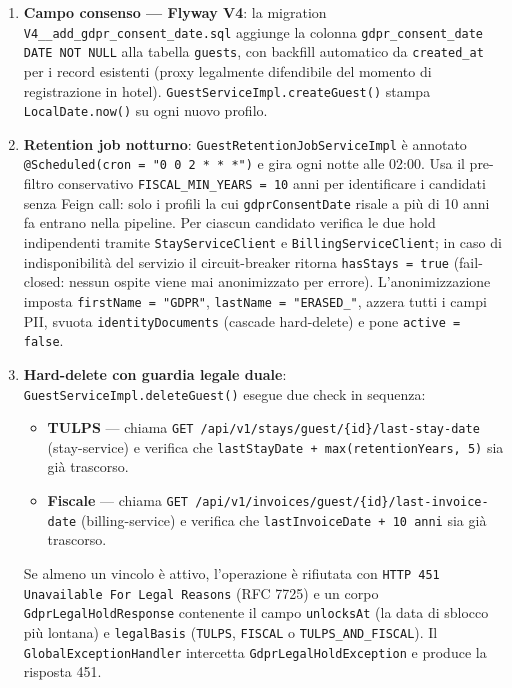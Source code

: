 ﻿\documentclass[a4paper,12pt]{report}
\begin{document}
\begin{enumerate}
  \item \textbf{Campo consenso --- Flyway V4}: la migration
        \texttt{V4\_\_add\_gdpr\_consent\_date.sql} aggiunge la colonna
        \texttt{gdpr\_consent\_date DATE NOT NULL} alla tabella \texttt{guests},
        con backfill automatico da \texttt{created\_at} per i record esistenti
        (proxy legalmente difendibile del momento di registrazione in hotel).
        \texttt{GuestServiceImpl.createGuest()} stampa \texttt{LocalDate.now()}
        su ogni nuovo profilo.

  \item \textbf{Retention job notturno}:
        \texttt{GuestRetentionJobServiceImpl} è annotato
        \texttt{@Scheduled(cron = "0 0 2 * * *")} e gira ogni notte alle 02:00.
        Usa il pre-filtro conservativo \texttt{FISCAL\_MIN\_YEARS = 10} anni
        per identificare i candidati senza Feign call: solo i profili la cui
        \texttt{gdprConsentDate} risale a più di 10 anni fa entrano nella
        pipeline. Per ciascun candidato verifica le due hold indipendenti tramite
        \texttt{StayServiceClient} e \texttt{BillingServiceClient}; in caso di
        indisponibilità del servizio il circuit-breaker ritorna
        \texttt{hasStays = true} (fail-closed: nessun ospite viene mai
        anonimizzato per errore). L'anonimizzazione imposta
        \texttt{firstName = "GDPR"}, \texttt{lastName = "ERASED\_<id-prefix>"},
        azzera tutti i campi PII, svuota \texttt{identityDocuments}
        (cascade hard-delete) e pone \texttt{active = false}.

  \item \textbf{Hard-delete con guardia legale duale}:
        \texttt{GuestServiceImpl.deleteGuest()} esegue due check in sequenza:
        \begin{itemize}
          \item \textbf{TULPS} --- chiama \texttt{GET /api/v1/stays/guest/\{id\}/last-stay-date}
                (stay-service) e verifica che \texttt{lastStayDate + max(retentionYears, 5)} sia
                già trascorso.
          \item \textbf{Fiscale} --- chiama \texttt{GET /api/v1/invoices/guest/\{id\}/last-invoice-date}
                (billing-service) e verifica che \texttt{lastInvoiceDate + 10 anni} sia
                già trascorso.
        \end{itemize}
        Se almeno un vincolo è attivo, l'operazione è rifiutata con
        \texttt{HTTP 451 Unavailable For Legal Reasons} (RFC 7725) e un corpo
        \texttt{GdprLegalHoldResponse} contenente il campo \texttt{unlocksAt}
        (la data di sblocco più lontana) e \texttt{legalBasis}
        (\texttt{TULPS}, \texttt{FISCAL} o \texttt{TULPS\_AND\_FISCAL}).
        Il \texttt{GlobalExceptionHandler} intercetta
        \texttt{GdprLegalHoldException} e produce la risposta 451.


\end{enumerate}
\end{document}
